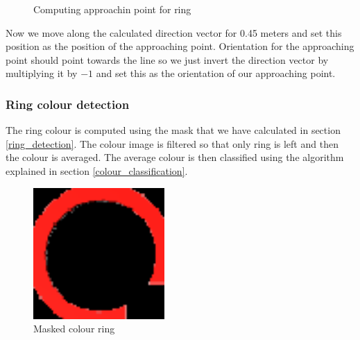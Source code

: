 \documentclass[12pt,a4paper]{article}
\begin{document}
	\begin{figure}[h]
		\centering
		\caption{Computing approachin point for ring}
		\label{fig:ring_approaching_point_computation}
	\end{figure}

	Now we move along the calculated direction vector for 0.45 meters and set this position as the position of the approaching point. Orientation for the approaching point should point towards the line so we just invert the direction vector by multiplying it by $-1$ and set this as the orientation of our approaching point.

	\subsubsection{Ring colour detection}
	The ring colour is computed using the mask that we have calculated in section \ref{ring_detection}. The colour  image is filtered so that only ring is left and then the colour is averaged. The average colour is then classified using the algorithm explained in section \ref{colour_classification}.
	
	\begin{figure}[h]
		\centering
		\includegraphics[height=5cm]{images/ring_detection_colour}
		\caption{Masked colour ring}
		\label{fig:masked_colour_ring}
	\end{figure}
		
\end{document}
